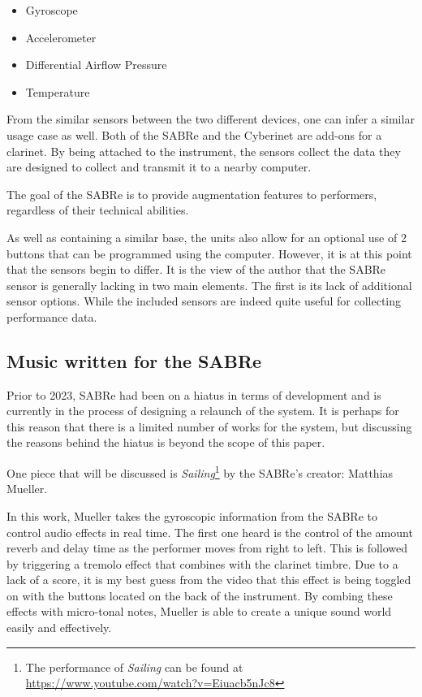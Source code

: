 \begin{itemize}
    \item Gyroscope
    \item Accelerometer 
    \item Differential Airflow Pressure
    \item Temperature
\end{itemize}

From the similar sensors between the two different devices, one can infer a similar usage case as well. Both of the SABRe and the Cyberinet are add-ons for a clarinet. By being attached to the instrument, the sensors collect the data they are designed to collect and transmit it to a nearby computer.

The goal of the SABRe is to provide augmentation features to performers, regardless of their technical abilities\cite{Schiesser2012}.

As well as containing a similar base, the units also allow for an optional use of 2 buttons that can be programmed using the computer. However, it is at this point that the sensors begin to differ. It is the view of the author that the SABRe sensor is generally lacking in two main elements. The first is its lack of additional sensor options. While the included sensors are indeed quite useful for collecting performance data.

\subsection{Music written for the SABRe}

Prior to 2023, SABRe had been on a hiatus in terms of development and is currently in the process of designing a relaunch of the system. It is perhaps for this reason that there is a limited number of works for the system, but discussing the reasons behind the hiatus is beyond the scope of this paper.

One piece that will be discussed is  \textit{Sailing}\footnote{The performance of \textit{Sailing} can be found at \url{https://www.youtube.com/watch?v=Eiuacb5nJc8}} by the SABRe's creator: Matthias Mueller.  

In this work, Mueller takes the gyroscopic information from the SABRe to control audio effects in real time. The first one heard is the control of the amount reverb and delay time as the performer moves from right to left. This is followed by triggering a tremolo effect that combines with the clarinet timbre. Due to a lack of a score, it is my best guess from the video that this effect is being toggled on with the buttons located on the back of the instrument. By combing these effects with micro-tonal notes, Mueller is able to create a unique sound world easily and effectively.

